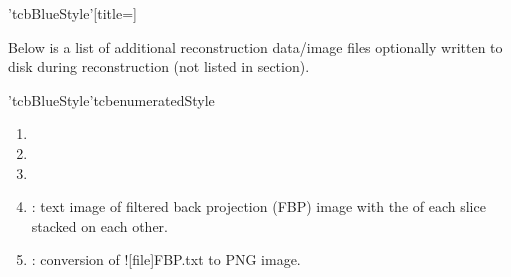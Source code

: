 \clearpage
{}
\begin{tcbenvironment}'tcbBlueStyle'[title=]
\begin{tcbContentsBox}
 Below is a list of additional reconstruction data/image files optionally written to disk during reconstruction (not listed in  section).
\end{tcbContentsBox}
\begin{tcbparagraph}'tcbBlueStyle'{tcbenumeratedStyle}
\begin{enumerate}
	\item {}
	\item {}
	\item {}
	\item {} : text image of filtered back projection (FBP) image with the \xyplane* of each slice stacked on each other.
	\item {} : conversion of \docentry![file]{FBP.txt} to PNG image.

\end{enumerate}
\end{tcbparagraph}
\end{tcbenvironment}
